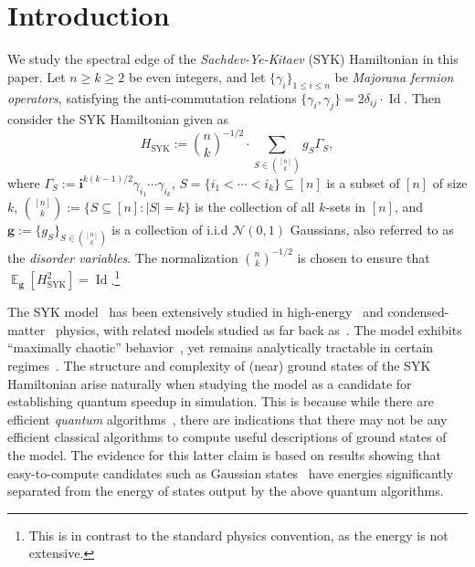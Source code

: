 \documentclass
[11pt,letterpaper]
{article}
\theoremstyle{definition}
\newcommand{\cN}{\mathcal{N}}
\newcommand{\1}{\mathbf{1}}
\newcommand{\Id}{\operatorname{Id}}
\newcommand{\seq}{\subseteq}
\DeclareMathOperator*{\E}{\mathbb{E}}
\renewcommand{\geq}{\geqslant}
\renewcommand{\leq}{\leqslant}
\renewcommand{\iota}{\mathbf{i}}
\begin{document}
\section{Introduction}
We study the spectral edge of the \emph{Sachdev-Ye-Kitaev} (SYK) Hamiltonian \cite{SachdevY93,Kitaev15,MaldacenaS16,Sachdev24} in this paper. Let $n\geq k\geq 2$ be even integers, and let $\{\gamma_i\}_{1\leq i\leq n}$ be \emph{Majorana fermion operators}, satisfying the anti-commutation relations $\{\gamma_i, \gamma_j\} = 2\delta_{ij}\cdot\Id$. Then consider the SYK Hamiltonian given as 
\begin{equation}\label{eq:SYK-intro-def}
    H_{\operatorname{SYK}} := \binom{n}{k}^{-1/2}\cdot\sum_{S\in\binom{[n]}{k}}g_S\Gamma_S,
\end{equation}
where $\Gamma_S:= \iota^{k(k - 1)/2}\gamma_{i_1}\cdots\gamma_{i_k}$, $S = \{i_1 < \cdots < i_k\}\seq[n]$ is a subset of $[n]$ of size $k$, $\binom{[n]}{k}:= \{S\seq[n]: |S| = k\}$ is the collection of all $k$-sets in $[n]$, and $\bm g:= \{g_S\}_{S\in\binom{[n]}{k}}$ is a collection of i.i.d $\cN(0, 1)$ Gaussians, also referred to as the \emph{disorder variables}. The normalization $\binom{n}{k}^{-1/2}$ is chosen to ensure that $\E_{\bm g}[H_{\operatorname{SYK}}^2] = \Id$.\footnote{This is in contrast to the standard physics convention, as the energy is not extensive.}

The SYK model~\cite{SachdevY93,Kitaev15} has been extensively studied in high-energy~\cite{Kitaev15,MaldacenaS16,polchinski2016spectrum,rosenhaus2019introduction} and condensed-matter~\cite{SachdevY93,SYK_review} physics, with related models studied as far back as~\cite{syk_old1,syk_old2}. The model exhibits ``maximally chaotic'' behavior~\cite{Kitaev15,maldacena2016bound,MaldacenaS16}, yet remains analytically tractable in certain regimes~\cite{SYK_Berkooz2,SYK_Berkooz3}. The structure and complexity of (near) ground states of the SYK Hamiltonian arise naturally when studying the model as a candidate for establishing quantum speedup in simulation. This is because while there are efficient \emph{quantum} algorithms~\cite{hastings2022optimizing,basso2024optimizing}, there are indications that there may not be any efficient classical algorithms to compute useful descriptions of ground states of the model. The evidence for this latter claim is based on results showing that easy-to-compute candidates such as Gaussian states~\cite{HaldarGaussian,dingOptimizingSparseSYK2026} have energies significantly separated from the energy of states output by the above quantum algorithms. 
\end{document}
